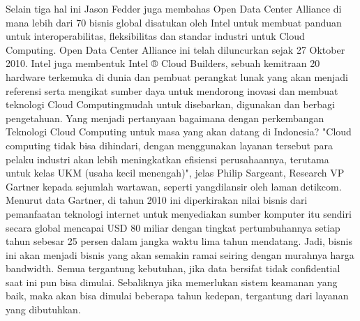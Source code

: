 \tab Selain tiga hal ini Jason Fedder juga membahas Open Data Center Alliance di mana lebih dari 70 bisnis global disatukan oleh Intel untuk membuat panduan untuk interoperabilitas, fleksibilitas dan standar industri untuk Cloud Computing. Open Data Center Alliance ini telah diluncurkan sejak 27 Oktober 2010. Intel juga membentuk Intel ® Cloud Builders, sebuah kemitraan 20 hardware terkemuka di dunia dan pembuat perangkat lunak yang akan menjadi referensi serta mengikat sumber daya untuk mendorong inovasi dan membuat teknologi Cloud Computingmudah untuk disebarkan, digunakan dan berbagi pengetahuan. Yang menjadi pertanyaan bagaimana dengan perkembangan Teknologi Cloud Computing untuk masa yang akan datang di Indonesia? "Cloud computing tidak bisa dihindari, dengan menggunakan layanan tersebut para pelaku industri akan lebih meningkatkan efisiensi perusahaannya, terutama untuk kelas UKM (usaha kecil menengah)", jelas Philip Sargeant, Research VP Gartner kepada sejumlah wartawan, seperti yangdilansir oleh laman detikcom. \\Menurut data Gartner, di tahun 2010 ini diperkirakan nilai bisnis dari pemanfaatan teknologi internet untuk menyediakan sumber komputer itu sendiri secara global mencapai USD 80 miliar dengan tingkat pertumbuhannya setiap tahun sebesar 25 persen dalam jangka waktu lima tahun mendatang. Jadi, bisnis ini akan menjadi bisnis yang akan semakin ramai seiring dengan murahnya harga bandwidth. Semua tergantung kebutuhan, jika data bersifat tidak confidential saat ini pun bisa dimulai. Sebaliknya jika memerlukan sistem keamanan yang baik, maka akan bisa dimulai beberapa tahun kedepan, tergantung dari layanan yang dibutuhkan.